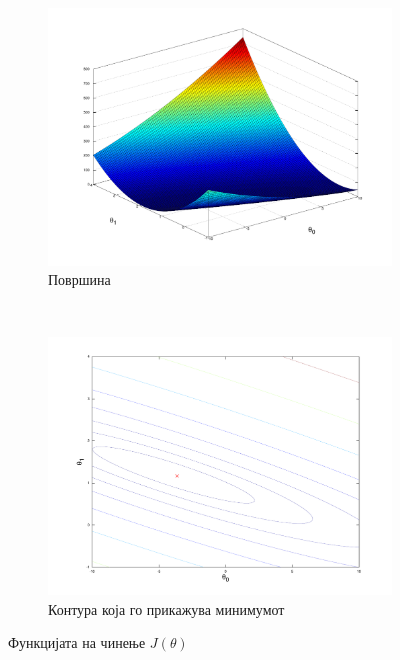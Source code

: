 \begin{figure}[htbp]
        \begin{subfigure}[b]{0.5\textwidth}
                \centering
                \includegraphics[width=\textwidth]{src/linearRegression/surface_plot}
                \caption{Површина}
                \label{fig:surface}
        \end{subfigure}%
        ~ 
        \begin{subfigure}[b]{0.5\textwidth}
                \centering
                \includegraphics[width=\textwidth]{src/linearRegression/contour}
                \caption{Контура која го прикажува минимумот}
                \label{fig:contour}
        \end{subfigure}
        \caption{Функцијата на чинење $J(\theta)$}
        \label{fig:cost_function}
\end{figure}

